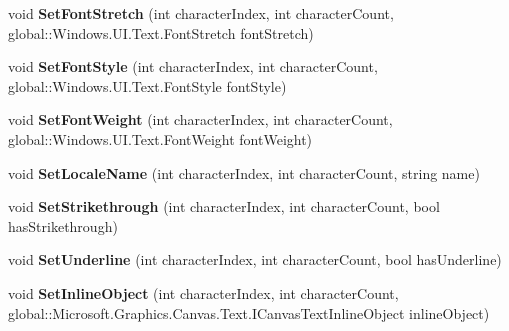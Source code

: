 \begin{DoxyCompactItemize}
void {\bfseries Set\+Font\+Stretch} (int character\+Index, int character\+Count, global\+::\+Windows.\+U\+I.\+Text.\+Font\+Stretch font\+Stretch)
\item 
\mbox{\label{interface_microsoft_1_1_graphics_1_1_canvas_1_1_text_1_1_i_canvas_text_layout_a6d809f3be58dcdf67400baee7baa91dc}} 
void {\bfseries Set\+Font\+Style} (int character\+Index, int character\+Count, global\+::\+Windows.\+U\+I.\+Text.\+Font\+Style font\+Style)
\item 
\mbox{\label{interface_microsoft_1_1_graphics_1_1_canvas_1_1_text_1_1_i_canvas_text_layout_aa79822a15fdf118523f58709bb123fc4}} 
void {\bfseries Set\+Font\+Weight} (int character\+Index, int character\+Count, global\+::\+Windows.\+U\+I.\+Text.\+Font\+Weight font\+Weight)
\item 
\mbox{\label{interface_microsoft_1_1_graphics_1_1_canvas_1_1_text_1_1_i_canvas_text_layout_a3ae7da339881c3d01eebeec801a99775}} 
void {\bfseries Set\+Locale\+Name} (int character\+Index, int character\+Count, string name)
\item 
\mbox{\label{interface_microsoft_1_1_graphics_1_1_canvas_1_1_text_1_1_i_canvas_text_layout_adf262145bc6d14b65076e7bb974b82d4}} 
void {\bfseries Set\+Strikethrough} (int character\+Index, int character\+Count, bool has\+Strikethrough)
\item 
\mbox{\label{interface_microsoft_1_1_graphics_1_1_canvas_1_1_text_1_1_i_canvas_text_layout_a629390d20f6e2f22860ca237e72881ee}} 
void {\bfseries Set\+Underline} (int character\+Index, int character\+Count, bool has\+Underline)
\item 
\mbox{\label{interface_microsoft_1_1_graphics_1_1_canvas_1_1_text_1_1_i_canvas_text_layout_a36f4e4337bca474c30dbc45e8e5271af}} 
void {\bfseries Set\+Inline\+Object} (int character\+Index, int character\+Count, global\+::\+Microsoft.\+Graphics.\+Canvas.\+Text.\+I\+Canvas\+Text\+Inline\+Object inline\+Object)

\end{DoxyCompactItemize}
